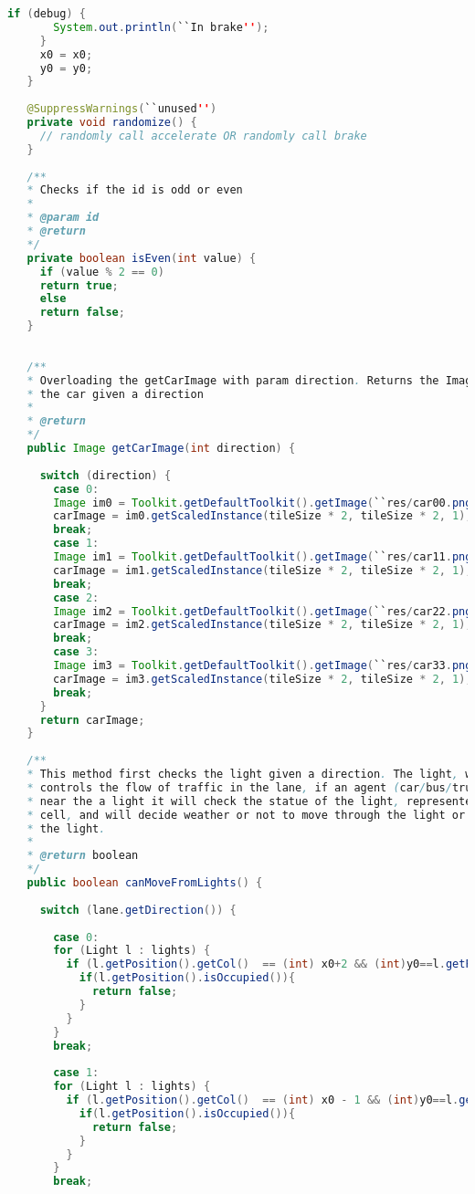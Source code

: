 \begin{lstlisting}[language=java]
     if (debug) {
       System.out.println(``In brake'');
     }
     x0 = x0;
     y0 = y0;
   }
   
   @SuppressWarnings(``unused'')
   private void randomize() {
     // randomly call accelerate OR randomly call brake
   }
   
   /**
   * Checks if the id is odd or even
   * 
   * @param id
   * @return
   */
   private boolean isEven(int value) {
     if (value % 2 == 0)
     return true;
     else
     return false;
   }
   
   
   /**
   * Overloading the getCarImage with param direction. Returns the Image of
   * the car given a direction
   * 
   * @return
   */
   public Image getCarImage(int direction) {
     
     switch (direction) {
       case 0:
       Image im0 = Toolkit.getDefaultToolkit().getImage(``res/car00.png'');
       carImage = im0.getScaledInstance(tileSize * 2, tileSize * 2, 1);
       break;
       case 1:
       Image im1 = Toolkit.getDefaultToolkit().getImage(``res/car11.png'');
       carImage = im1.getScaledInstance(tileSize * 2, tileSize * 2, 1);
       break;
       case 2:
       Image im2 = Toolkit.getDefaultToolkit().getImage(``res/car22.png'');
       carImage = im2.getScaledInstance(tileSize * 2, tileSize * 2, 1);
       break;
       case 3:
       Image im3 = Toolkit.getDefaultToolkit().getImage(``res/car33.png'');
       carImage = im3.getScaledInstance(tileSize * 2, tileSize * 2, 1);
       break;
     }
     return carImage;
   }
   
   /**
   * This method first checks the light given a direction. The light, which
   * controls the flow of traffic in the lane, if an agent (car/bus/truck) is
   * near the a light it will check the statue of the light, represented as a
   * cell, and will decide weather or not to move through the light or stop at
   * the light.
   * 
   * @return boolean
   */
   public boolean canMoveFromLights() {
     
     switch (lane.getDirection()) {
       
       case 0:
       for (Light l : lights) {
         if (l.getPosition().getCol()  == (int) x0+2 && (int)y0==l.getPosition().getRow()) {
           if(l.getPosition().isOccupied()){
             return false;
           }
         }
       }
       break;
       
       case 1:
       for (Light l : lights) {
         if (l.getPosition().getCol()  == (int) x0 - 1 && (int)y0==l.getPosition().getRow()) {
           if(l.getPosition().isOccupied()){
             return false;
           }
         }
       }
       break;
       

\end{lstlisting}
